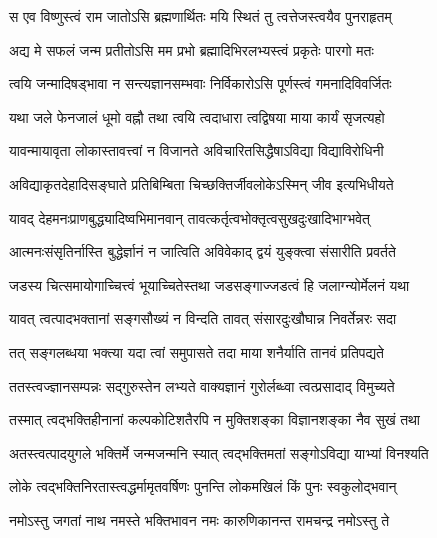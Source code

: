 

\addtocounter{shlokacount}{28}
\twolineshloka
{स एव विष्णुस्त्वं राम जातोऽसि ब्रह्मणार्थितः}
{मयि स्थितं तु त्वत्तेजस्त्वयैव पुनराहृतम्} %

\twolineshloka
{अद्य मे सफलं जन्म प्रतीतोऽसि मम प्रभो}
{ब्रह्मादिभिरलभ्यस्त्वं प्रकृतेः पारगो मतः} %

\twolineshloka
{त्वयि जन्मादिषड्भावा न सन्त्यज्ञानसम्भवाः}
{निर्विकारोऽसि पूर्णस्त्वं गमनादिविवर्जितः} %

\twolineshloka
{यथा जले फेनजालं धूमो वह्नौ तथा त्वयि}
{त्वदाधारा त्वद्विषया माया कार्यं सृजत्यहो} %

\twolineshloka
{यावन्मायावृता लोकास्तावत्त्वां न विजानते}
{अविचारितसिद्धैषाऽविद्या विद्याविरोधिनी} %

\twolineshloka
{अविद्याकृतदेहादिसङ्घाते प्रतिबिम्बिता}
{चिच्छक्तिर्जीवलोकेऽस्मिन् जीव इत्यभिधीयते} %

\twolineshloka
{यावद् देहमनःप्राणबुद्ध्यादिष्वभिमानवान्}
{तावत्कर्तृत्वभोक्तृत्वसुखदुःखादिभाग्भवेत्} %

\twolineshloka
{आत्मनःसंसृतिर्नास्ति बुद्धेर्ज्ञानं न जात्विति}
{अविवेकाद् द्वयं युङ्क्त्वा संसारीति प्रवर्तते} %

\twolineshloka
{जडस्य चित्समायोगाच्चित्त्वं भूयाच्चितेस्तथा}
{जडसङ्गाज्जडत्वं हि जलाग्न्योर्मेलनं यथा} %

\twolineshloka
{यावत् त्वत्पादभक्तानां सङ्गसौख्यं न विन्दति}
{तावत् संसारदुःखौघान्न निवर्तेन्नरः सदा} %

\twolineshloka
{तत् सङ्गलब्धया भक्त्या यदा त्वां समुपासते}
{तदा माया शनैर्याति तानवं प्रतिपद्यते} %

\twolineshloka
{ततस्त्वज्ज्ञानसम्पन्नः सद्गुरुस्तेन लभ्यते}
{वाक्यज्ञानं गुरोर्लब्ध्वा त्वत्प्रसादाद् विमुच्यते} %

\twolineshloka
{तस्मात् त्वद्भक्तिहीनानां कल्पकोटिशतैरपि}
{न मुक्तिशङ्का विज्ञानशङ्का नैव सुखं तथा} %

\twolineshloka
{अतस्त्वत्पादयुगले भक्तिर्मे जन्मजन्मनि}
{स्यात् त्वद्भक्तिमतां सङ्गोऽविद्या याभ्यां विनश्यति} %

\twolineshloka
{लोके त्वद्भक्तिनिरतास्त्वद्धर्मामृतवर्षिणः}
{पुनन्ति लोकमखिलं किं पुनः स्वकुलोद्भवान्} %

\twolineshloka
{नमोऽस्तु जगतां नाथ नमस्ते भक्तिभावन}
{नमः कारुणिकानन्त रामचन्द्र नमोऽस्तु ते} %

